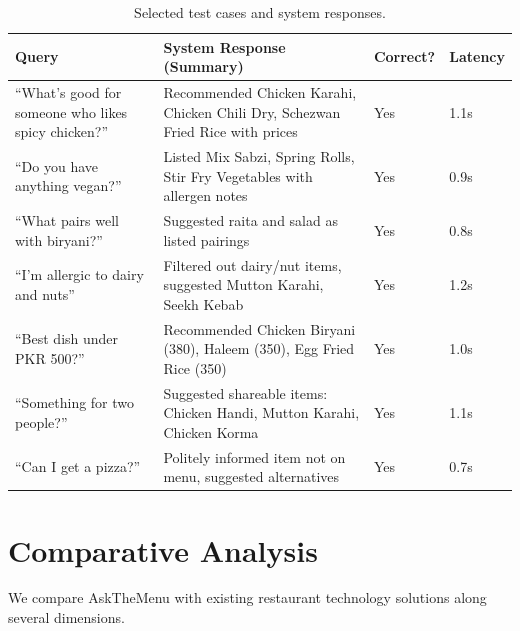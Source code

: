 \begin{table}[pos=h]
\caption{Selected test cases and system responses.}\label{tbl:testcases}
\begin{tabular*}{\textwidth}{@{}p{}p{}p{}p{}@{}}
\toprule
Query & System Response (Summary) & Correct? & Latency \\
\midrule
``What's good for someone who likes spicy chicken?'' & Recommended Chicken Karahi, Chicken Chili Dry, Schezwan Fried Rice with prices & Yes & 1.1s \\
``Do you have anything vegan?'' & Listed Mix Sabzi, Spring Rolls, Stir Fry Vegetables with allergen notes & Yes & 0.9s \\
``What pairs well with biryani?'' & Suggested raita and salad as listed pairings & Yes & 0.8s \\
``I'm allergic to dairy and nuts'' & Filtered out dairy/nut items, suggested Mutton Karahi, Seekh Kebab & Yes & 1.2s \\
``Best dish under PKR 500?'' & Recommended Chicken Biryani (380), Haleem (350), Egg Fried Rice (350) & Yes & 1.0s \\
``Something for two people?'' & Suggested shareable items: Chicken Handi, Mutton Karahi, Chicken Korma & Yes & 1.1s \\
``Can I get a pizza?'' & Politely informed item not on menu, suggested alternatives & Yes & 0.7s \\
\bottomrule
\end{tabular*}
\end{table}


\section{Comparative Analysis}\label{sec:comparative}

We compare AskTheMenu with existing restaurant technology solutions along several dimensions.

